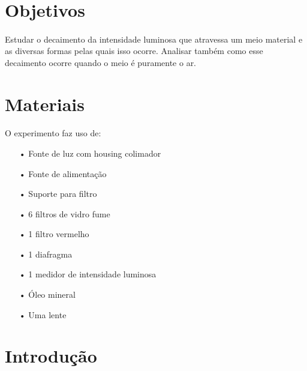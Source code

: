 \documentclass[a4paper,11pt]{article}
\begin{document}


\newpage
\thispagestyle{empty}
\mbox{ }
\newpage
\tableofcontents

\newpage

\section{Objetivos}
\paragraph{} Estudar o decaimento da intensidade luminosa que atravessa um meio material e as diversas formas pelas quais isso ocorre. Analisar também como esse decaimento ocorre quando o meio é puramente o ar.
\section{Materiais}
\paragraph{} O experimento faz uso de:
\begin{itemize}
	\item[•]Fonte de luz com housing colimador
	\item[•]Fonte de alimentação
	\item[•]Suporte para filtro
	\item[•]6 filtros de vidro fume
	\item[•]1 filtro vermelho
	\item[•]1 diafragma
	\item[•]1 medidor de intensidade luminosa
	\item[•]Óleo mineral
	\item[•]Uma lente
\end{itemize} 

\newpage
\section{Introdução}
\end{document}
